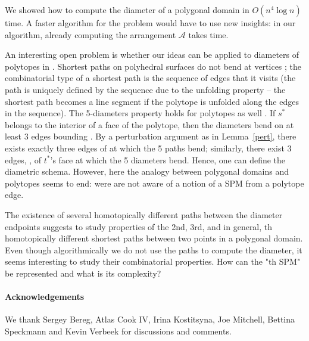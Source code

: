 \documentclass{llncs}
\renewcommand{\cal}[1]{\ensuremath{\mathcal{#1}}\xspace}
\renewcommand\-{\textrm{-}}
\renewcommand{\O}[1]{\ensuremath{O(#1 \log n)}\xspace}
\renewcommand\ss{\ensuremath{s^*}\xspace}
\renewcommand\tt{\ensuremath{t^*}\xspace}
\newcommand{\A}{\ensuremath{\cal{A}}\xspace}
\begin{document}
We showed how to compute the diameter of a polygonal domain in \O{n^4} time. A faster algorithm for the problem would have to use new insights: in our algorithm, already computing the arrangement \A takes  time.

An interesting open problem is whether our ideas can be applied to diameters of polytopes in  \cite{star,atlas,orourke}. Shortest paths on polyhedral surfaces do not bend at vertices \cite{ss}; the combinatorial type of a shortest path is the sequence of edges that it visits (the path is uniquely defined by the sequence due to the unfolding property -- the shortest path becomes a line segment if the polytope is unfolded along the edges in the sequence). The 5-diameters property holds for polytopes as well \cite{orourke}. If \ss belongs to the interior of a face  of the polytope, then the diameters bend on at least 3 edges bounding . By a perturbation argument as in Lemma~\ref{pert}, there exists exactly three edges  of  at which the 5 paths bend; similarly, there exist 3 edges, , of \tt's face at which the 5 diameters bend. Hence, one can define the diametric schema. However, here the analogy between polygonal domains and polytopes seems to end: were are not aware of a notion of a SPM from a polytope edge.

The existence of several homotopically different paths between the diameter endpoints suggests to study properties of the 2nd, 3rd, and in general, th homotopically different shortest paths between two points in a polygonal domain. Even though algorithmically we do not use the paths to compute the diameter, it seems interesting to study their combinatorial properties. How can the "th SPM" be represented and what is its complexity?
\paragraph{Acknowledgements} We thank Sergey Bereg, Atlas Cook IV, Irina Kostitsyna, Joe Mitchell, Bettina Speckmann and Kevin Verbeek for discussions and comments. 
\end{document}
